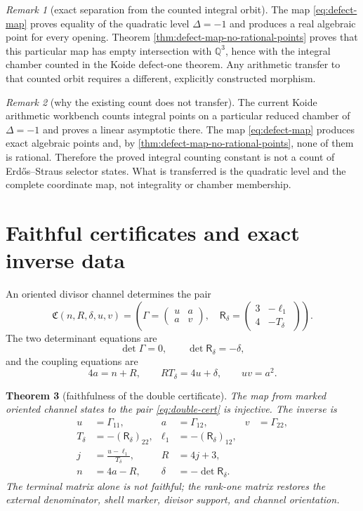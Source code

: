 \documentclass[11pt]{article}
\newtheorem{theorem}{Theorem}[section]
\theoremstyle{definition}
\theoremstyle{remark}
\newtheorem{remark}[theorem]{Remark}
\newcommand{\1}{\mathbf 1}
\newcommand{\mat}[4]{\begin{pmatrix}#1&#2\\#3&#4\end{pmatrix}}
\begin{document}
\begin{remark}[exact separation from the counted integral orbit]
The map \eqref{eq:defect-map} proves equality of the quadratic level
$\Delta=-1$ and produces a real algebraic point for every opening.  Theorem
\ref{thm:defect-map-no-rational-points} proves that this particular map has
empty intersection with $\mathbb Q^3$, hence with the integral chamber counted
in the Koide defect-one theorem.  Any arithmetic transfer to that counted
orbit requires a different, explicitly constructed morphism.
\end{remark}

\begin{remark}[why the existing count does not transfer]
The current Koide arithmetic workbench counts integral points on a particular
reduced chamber of $\Delta=-1$ and proves a linear asymptotic there.  The map
\eqref{eq:defect-map} produces exact algebraic points and, by
\cref{thm:defect-map-no-rational-points}, none of them is rational.  Therefore
the proved integral counting constant is not a count of Erdős--Straus selector
states.  What is transferred is the
quadratic level and the complete coordinate map, not integrality or chamber
membership.
\end{remark}

\section{Faithful certificates and exact inverse data}

An oriented divisor channel determines the pair
\begin{equation}\label{eq:double-cert}
 \mathfrak C(n,R,\delta,u,v)
 =\left(
 \Gamma=\mat{u}{a}{a}{v},
 \quad
 \mathsf R_\delta=\mat{3}{-\ell_1}{4}{-T_\delta}
 \right).
\end{equation}
The two determinant equations are
\begin{equation}\label{eq:two-dets}
 \det\Gamma=0,
 \qquad
 \det\mathsf R_\delta=-\delta,
\end{equation}
and the coupling equations are
\begin{equation}\label{eq:coupling}
 4a=n+R,
 \qquad
 RT_\delta=4u+\delta,
 \qquad
 uv=a^2.
\end{equation}

\begin{theorem}[faithfulness of the double certificate]
\label{thm:faithful}
The map from marked oriented channel states to the pair
\eqref{eq:double-cert} is injective.  The inverse is
\begin{align}
 u&=\Gamma_{11},&a&=\Gamma_{12},&v&=\Gamma_{22},\label{eq:inverse-Gamma}\\
 T_\delta&=-(\mathsf R_\delta)_{22},&
 \ell_1&=-(\mathsf R_\delta)_{12},\label{eq:inverse-R}\\
 j&=\frac{u-\ell_1}{T_\delta},&
 R&=4j+3,\label{eq:inverse-j}\\
 n&=4a-R,&
 \delta&=-\det\mathsf R_\delta.\label{eq:inverse-n-delta}
\end{align}
The terminal matrix alone is not faithful; the rank-one matrix restores the
external denominator, shell marker, divisor support, and channel orientation.
\end{theorem}
\end{document}
